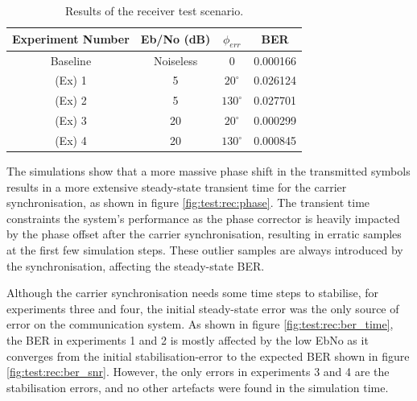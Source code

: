 \documentclass[12pt,a4paper]{report}
\begin{document}
\begin{table}[h]
    \centering
    \begin{tabular}{c|c|c||c}
        Experiment Number & Eb/No (dB) & $\phi_{err}$ & BER \\ \hline
        Baseline & Noiseless & 0 & 0.000166 \\
        (Ex) 1 & 5 & $20^\circ$   & 0.026124 \\ 
        (Ex) 2 & 5 & $130^\circ$  & 0.027701 \\
        (Ex) 3 & 20 & $20^\circ$  & 0.000299 \\
        (Ex) 4 & 20 & $130^\circ$ & 0.000845
    \end{tabular}
    \caption{Results of the receiver test scenario.}
    \label{tab:test:rec:test_params}
\end{table}

The simulations show that a more massive phase shift in the transmitted symbols results in a more extensive steady-state transient time for the carrier synchronisation, as shown in figure \ref{fig:test:rec:phase}. The transient time constraints the system's performance as the phase corrector is heavily impacted by the phase offset after the carrier synchronisation, resulting in erratic samples at the first few simulation steps. These outlier samples are always introduced by the synchronisation, affecting the steady-state BER. 

Although the carrier synchronisation needs some time steps to stabilise, for experiments three and four, the initial steady-state error was the only source of error on the communication system. As shown in figure \ref{fig:test:rec:ber_time}, the BER in experiments 1 and 2 is mostly affected by the low EbNo as it converges from the initial stabilisation-error to the expected BER shown in figure \ref{fig:test:rec:ber_snr}. However, the only errors in experiments 3 and 4 are the stabilisation errors, and no other artefacts were found in the simulation time.
\end{document}
